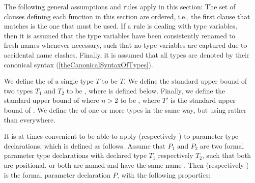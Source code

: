 \documentclass[makeidx]{article}
\begin{document}
{


\LMHash{}%
The following general assumptions and rules apply in this section:
The set of clauses defining each function in this section are ordered,
i.e., the first clause that matches is the one that must be used.
If a rule is dealing with type variables,
then it is assumed that the type variables have been
consistently renamed to fresh names whenever necessary,
such that no type variables are captured due to accidental name clashes.
Finally, it is assumed that all types are denoted by their canonical syntax
(\ref{theCanonicalSyntaxOfTypes}).


\LMHash{}%
We define the
of a single type $T$ to be $T$.
We define the standard upper bound of two types $T_1$ and $T_2$ to be
, where \UpperBoundTypeName{} is defined below.
Finally, we define the standard upper bound
of  where $n > 2$
to be ,
where $T'$ is the standard upper bound of .
We define the
of one or more types in the same way,
but using \LowerBoundTypeName{} rather than \UpperBoundTypeName{} everywhere.

\LMHash{}%
It is at times convenient to be able to apply
\UpperBoundTypeName{} (respectively \LowerBoundTypeName)
to parameter type declarations,
which is defined as follows.
Assume that $P_1$ and $P_2$ are two formal parameter type declarations
with declared type $T_1$ respectively $T_2$,
such that both are positional,
or both are named and have the same name .
Then  (respectively )
is the formal parameter declaration $P$,
with the following proporties:

}
\end{document}
